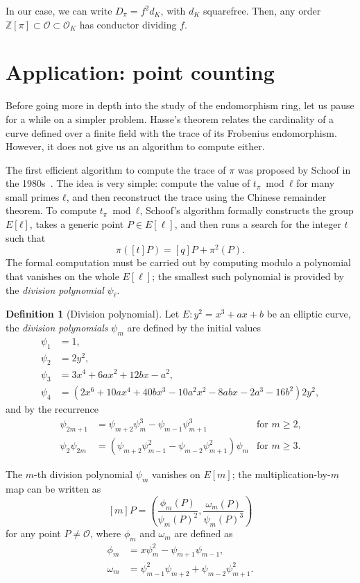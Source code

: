 \documentclass[10pt]{article}
\theoremstyle{plain}
\theoremstyle{definition}
\newtheorem{definition}[theorem]{Definition}
\def\O{\ensuremath{\mathcal{O}}}
\begin{document}
In our case, we can write $D_π=f^2d_K$, with $d_K$
squarefree. %
Then, any order $ℤ[π] ⊂ \O ⊂ \O_K$ has conductor dividing $f$.

\section{Application: point counting}
\label{sec:appl-point-count}

Before going more in depth into the study of the endomorphism ring,
let us pause for a while on a simpler problem. %
Hasse's theorem relates the cardinality of a curve defined over a
finite field with the trace of its Frobenius endomorphism. %
However, it does not give us an algorithm to compute either.

The first efficient algorithm to compute the trace of $π$ was proposed
by Schoof in the 1980s~\cite{schoof85}. %
The idea is very simple: compute the value of $t_π\bmod ℓ$ for many
small primes $ℓ$, and then reconstruct the trace using the Chinese
remainder theorem. %
To compute $t_π\bmod ℓ$, Schoof's algorithm formally constructs the
group $E[ℓ]$, takes a generic point $P∈E[\ell]$, and then runs a
search for the integer $t$ such that
\[π([t]P) = [q]P + π^2(P).\] %
The formal computation must be carried out by computing modulo a
polynomial that vanishes on the whole $E[\ell]$; the smallest such
polynomial is provided by the \emph{division polynomial} $ψ_ℓ$.

\begin{definition}[Division polynomial]
  Let $E:y^2=x^3+ax+b$ be an elliptic curve, the \emph{division
    polynomials} $ψ_m$ are defined by the initial values
  \begin{align*}
    ψ_1 &= 1,\\
    ψ_2 &= 2y^2,\\
    ψ_3 &= 3x^4 + 6ax^2 + 12bx - a^2,\\
    ψ_4 &= (2x^6 + 10ax^4 + 40bx^3 - 10a^2x^2 - 8abx - 2a^3 - 16b^2)2y^2,
  \end{align*}
  and by the recurrence
  \begin{align*}
    ψ_{2m+1}  &= ψ_{m+2}ψ_m^3 - ψ_{m-1}ψ_{m+1}^3 &\text{for $m≥2$,}\\
    ψ_2ψ_{2m} &= (ψ_{m+2}ψ_{m-1}^2 - ψ_{m-2}ψ_{m+1}^2)ψ_m &\text{for $m≥3$.}
  \end{align*}

  The $m$-th division polynomial $ψ_m$ vanishes on $E[m]$;
  the multiplication-by-$m$ map can be written as
  \[[m]P = \left(\frac{ϕ_m(P)}{ψ_m(P)^2}, \frac{ω_m(P)}{ψ_m(P)^3}\right)\]
  for any point $P≠\O$, where $ϕ_m$ and $ω_m$ are defined as
  \begin{align*}
    ϕ_m &= xψ_m^2 - ψ_{m+1}ψ_{m-1},\\
    ω_m &= ψ_{m-1}^2ψ_{m+2} + ψ_{m-2}ψ_{m+1}^2.
  \end{align*}
\end{definition}
\end{document}
